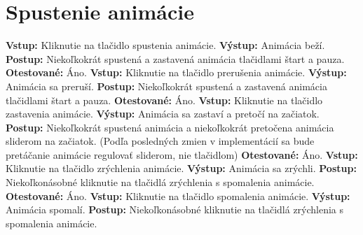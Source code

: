 \documentclass[12pt,a4paper]{report}
\begin{document}
\section[Spustenie animácie]{\rmfamily\bfseries
	Spustenie animácie}
\begin{flushleft}
	\textbf{Vstup:} Kliknutie na tlačidlo spustenia animácie.\linebreak
	\textbf{Výstup:} Animácia beží.\linebreak
	\textbf{Postup:} Niekoľkokrát spustená a zastavená animácia tlačidlami štart a pauza. \linebreak
	\textbf{Otestované:} Áno.\linebreak
	\linebreak
	\textbf{Vstup:} Kliknutie na tlačidlo prerušenia animácie.\linebreak
	\textbf{Výstup:} Animácia sa preruší.\linebreak
	\textbf{Postup:} Niekoľkokrát spustená a zastavená animácia tlačidlami štart a pauza. \linebreak
	\textbf{Otestované:} Áno.\linebreak
	\linebreak
	\textbf{Vstup:} Kliknutie na tlačidlo zastavenia animácie.\linebreak
	\textbf{Výstup:} Animácia sa zastaví a pretočí na začiatok.\linebreak
	\textbf{Postup:} Niekoľkokrát spustená animácia a niekoľkokrát pretočena animácia sliderom na začiatok. (Podľa posledných zmien v implementácií sa bude pretáčanie animácie regulovať sliderom, nie tlačidlom) \linebreak
	\textbf{Otestované:} Áno.\linebreak
	\linebreak
	\textbf{Vstup:} Kliknutie na tlačidlo zrýchlenia animácie.\linebreak
	\textbf{Výstup:} Animácia sa zrýchli.\linebreak
	\textbf{Postup:} Niekoľkonásobné kliknutie na tlačidlá zrýchlenia s spomalenia animácie. \linebreak
	\textbf{Otestované:} Áno.\linebreak
	\linebreak
	\textbf{Vstup:} Kliknutie na tlačidlo spomalenia animácie.\linebreak
	\textbf{Výstup:} Animácia spomalí.\linebreak
	\textbf{Postup:} Niekoľkonásobné kliknutie na tlačidlá zrýchlenia s spomalenia animácie. \linebreak

\end{flushleft}
\end{document}
